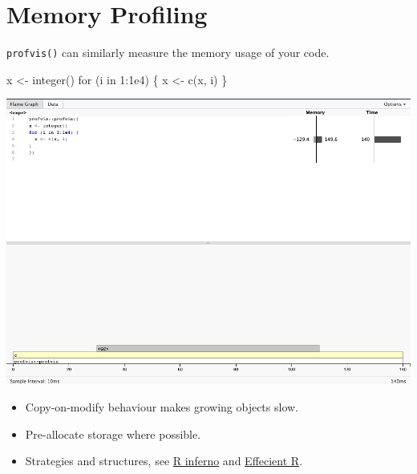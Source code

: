 \documentclass[
  letterpaper,
  DIV=11,
  numbers=noendperiod]{scrreprt}
\newenvironment{Shaded}{\begin{snugshade}}{\end{snugshade}}
\newcommand{\ControlFlowTok}[1]{\textcolor[rgb]{0.00,0.23,0.31}{#1}}
\newcommand{\DecValTok}[1]{\textcolor[rgb]{0.68,0.00,0.00}{#1}}
\newcommand{\FloatTok}[1]{\textcolor[rgb]{0.68,0.00,0.00}{#1}}
\newcommand{\FunctionTok}[1]{\textcolor[rgb]{0.28,0.35,0.67}{#1}}
\newcommand{\NormalTok}[1]{\textcolor[rgb]{0.00,0.23,0.31}{#1}}
\newcommand{\OtherTok}[1]{\textcolor[rgb]{0.00,0.23,0.31}{#1}}
\newcommand{\SpecialCharTok}[1]{\textcolor[rgb]{0.37,0.37,0.37}{#1}}
\providecommand{\tightlist}{%
  \setlength{\itemsep}{0pt}\setlength{\parskip}{0pt}}\usepackage{longtable,booktabs,array}
\begin{document}
\section{Memory Profiling}\label{memory-profiling}

\texttt{profvis()} can similarly measure the memory usage of your code.

\begin{Shaded}
\begin{Highlighting}[]
\NormalTok{x }\OtherTok{\textless{}{-}} \FunctionTok{integer}\NormalTok{()}
\ControlFlowTok{for}\NormalTok{ (i }\ControlFlowTok{in} \DecValTok{1}\SpecialCharTok{:}\FloatTok{1e4}\NormalTok{) \{}
\NormalTok{  x }\OtherTok{\textless{}{-}} \FunctionTok{c}\NormalTok{(x, i)}
\NormalTok{\}}
\end{Highlighting}
\end{Shaded}

\begin{center}
\includegraphics[width=1\textwidth,height=\textheight]{images/403-production-scalability/profiling-example-memory.png}
\end{center}

\begin{itemize}
\tightlist
\item
  Copy-on-modify behaviour makes growing objects slow.\\
\item
  Pre-allocate storage where possible.
\item
  Strategies and structures, see
  \href{https://www.burns-stat.com/pages/Tutor/R_inferno.pdf}{R inferno}
  and
  \href{https://csgillespie.github.io/efficientR/performance.html}{Effecient
  R}.
\end{itemize}
\end{document}
